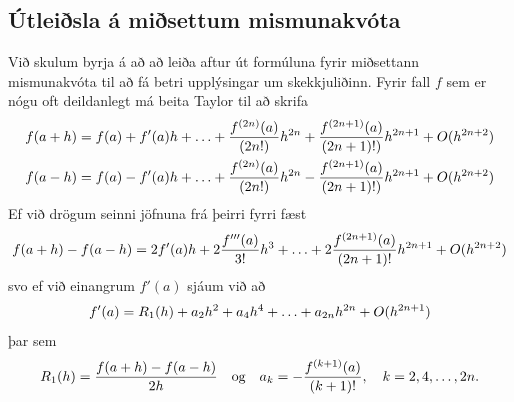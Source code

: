\documentclass[letterpaper,10pt,icelandic]{sphinxmanual}
\begin{document}
\subsection{Útleiðsla á miðsettum mismunakvóta}
\label{kafli04:utleisla-a-misettum-mismunakvota}
Við skulum byrja á að að leiða aftur út formúluna fyrir miðsettann
mismunakvóta til að fá betri upplýsingar um skekkjuliðinn. Fyrir fall
\(f\) sem er nógu oft deildanlegt má beita Taylor til að skrifa
\begin{gather}
\begin{split}\begin{aligned}
  f(a+h) &= f(a) + f'(a)h   + \ldots
  + \frac{f^{(2n)}(a)}{(2n!)}h^{2n}
  + \frac{f^{(2n+1)}(a)}{(2n+1)!)}h^{2n+1} + O(h^{2n+2}) \\
  f(a-h) &= f(a) - f'(a)h
    + \ldots
  + \frac{f^{(2n)}(a)}{(2n!)}h^{2n}
  - \frac{f^{(2n+1)}(a)}{(2n+1)!)}h^{2n+1} + O(h^{2n+2})\end{aligned}\end{split}\notag
\end{gather}
Ef við drögum seinni jöfnuna frá þeirri fyrri fæst
\begin{gather}
\begin{split}f(a+h)-f(a-h) = 2f'(a)h + 2\frac{f'''(a)}{3!}h^3
  + \ldots + 2\frac{f^{(2n+1)}(a)}{(2n+1)!}h^{2n+1} + O(h^{2n+2})\end{split}\notag
\end{gather}
svo ef við einangrum \(f'(a)\) sjáum við að
\begin{gather}
\begin{split}f'(a) = R_1(h)
  + a_2 h^2 + a_4 h^4 + \ldots + a_{2n} h^{2n} + O(h^{2n+1})\end{split}\notag
\end{gather}
þar sem
\begin{gather}
\begin{split}R_1(h) = \frac{f(a+h)-f(a-h)}{2h}
  \quad \text{og} \quad
  a_k = -\frac{f^{(k+1)}(a)}{(k+1)!},
  \quad k = 2,4,\ldots,2n.\end{split}\notag
\end{gather}
\end{document}
